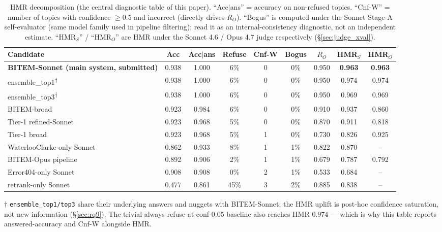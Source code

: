 \documentclass[11pt,a4paper]{article}
\begin{document}
\begin{table}[h]
\centering
\caption{HMR decomposition (the central diagnostic table of this paper).
``Acc$|$ans'' = accuracy on non-refused topics.
``Cnf-W'' = number of topics with confidence $\geq 0.5$ and incorrect
(directly drives $R_O$). ``Bogus'' is computed under the Sonnet
Stage-A self-evaluator (same model family used in pipeline
filtering); read it as an internal-consistency diagnostic, not an
independent estimate. ``HMR$_S$'' / ``HMR$_O$'' are HMR under the
Sonnet 4.6 / Opus 4.7 judge respectively (\S\ref{sec:judge_xval}).}
\label{tab:refusal_decomp}
\small
\begin{tabular}{lcccccccc}
\toprule
Candidate & Acc & Acc$|$ans & Refuse & Cnf-W & Bogus & $R_O$ & HMR$_S$ & HMR$_O$ \\
\midrule
\textbf{BITEM-Sonnet (main system, submitted)}
                             & 0.938 & 1.000 & 6\%  & 0 & 0\%  & 0.950 & \textbf{0.963} & \textbf{0.963} \\
ensemble\_top1\textsuperscript{$\dagger$}
                             & 0.938 & 1.000 & 6\%  & 0 & 0\%  & 0.950 & 0.974 & 0.974 \\
ensemble\_top3\textsuperscript{$\dagger$}
                             & 0.938 & 1.000 & 6\%  & 0 & 0\%  & 0.950 & 0.969 & 0.969 \\
BITEM-broad                  & 0.923 & 0.984 & 6\%  & 0 & 0\%  & 0.910 & 0.937 & 0.860 \\
Tier-1 refined-Sonnet        & 0.923 & 0.968 & 5\%  & 0 & 0\%  & 0.870 & 0.911 & 0.818 \\
Tier-1 broad                 & 0.923 & 0.968 & 5\%  & 1 & 0\%  & 0.730 & 0.826 & 0.925 \\
WaterlooClarke-only Sonnet   & 0.862 & 0.933 & 8\%  & 1 & 1\%  & 0.822 & 0.870 & --     \\
BITEM-Opus pipeline          & 0.892 & 0.906 & 2\%  & 1 & 1\%  & 0.679 & 0.787 & 0.792 \\
Error404-only Sonnet         & 0.908 & 0.908 & 0\%  & 2 & 1\%  & 0.533 & 0.684 & --     \\
retrank-only Sonnet          & 0.477 & 0.861 & 45\% & 3 & 2\%  & 0.885 & 0.838 & --     \\
\bottomrule
\end{tabular}

\smallskip
{\footnotesize
$\dagger$ \texttt{ensemble\_top1/top3} share their underlying answers
and nuggets with BITEM-Sonnet; the HMR uplift is post-hoc confidence
saturation, not new information (\S\ref{sec:rq9}). The trivial
always-refuse-at-conf-$0.05$ baseline also reaches HMR $0.974$ —
which is why this table reports answered-accuracy and Cnf-W
alongside HMR.
}
\end{table}
\end{document}
